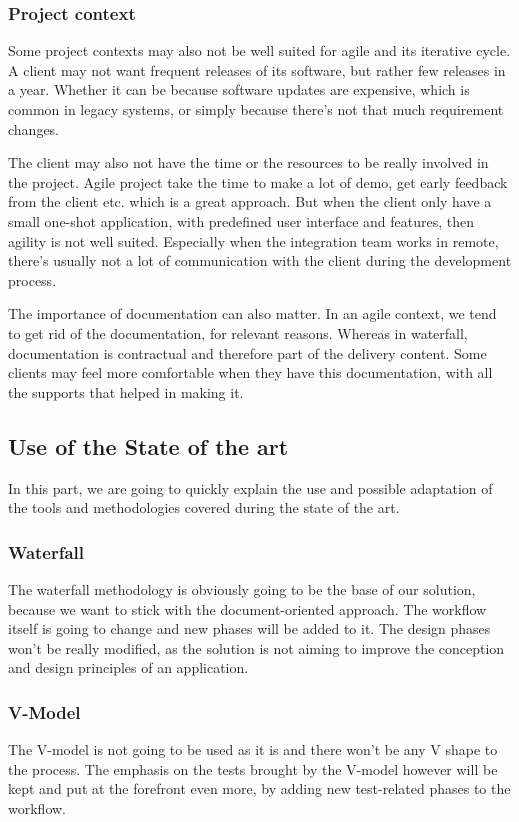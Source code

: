 \subsubsection{Project context}
Some project contexts may also not be well suited for agile and its iterative
cycle.
A client may not want frequent releases of its software, but rather few
releases in a year.
Whether it can be because software updates are expensive, which is common in
legacy systems, or simply because there's not that much requirement changes.

The client may also not have the time or the resources to be really involved
in the project.
Agile project take the time to make a lot of demo, get early feedback from
the client etc.
which is a great approach.
But when the client only have a small one-shot application, with predefined
user interface and features, then agility is not well suited.
Especially when the integration team works in remote, there's usually not a
lot of communication with the client during the development process.

The importance of documentation can also matter.
In an agile context, we tend to get rid of the documentation, for relevant
reasons.
Whereas in waterfall, documentation is contractual and therefore part of the
delivery content.
Some clients may feel more comfortable when they have this documentation,
with all the supports that helped in making it.

\subsection{Use of the State of the art}\label{subsec:use-of-the-state-of-the-art}

In this part, we are going to quickly explain the use and possible adaptation
of the tools and methodologies covered during the state of the art.

\subsubsection{Waterfall}
The waterfall methodology is obviously going to be the base of our solution,
because we want to stick with the document-oriented approach.
The workflow itself is going to change and new phases will be added to it.
The design phases won't be really modified, as the solution is not aiming to
improve the conception and design principles of an application.

\subsubsection{V-Model}
The V-model is not going to be used as it is and there won't be any V shape
to the process.
The emphasis on the tests brought by the V-model however will be kept and
put at the forefront even more, by adding new test-related phases to the
workflow.

